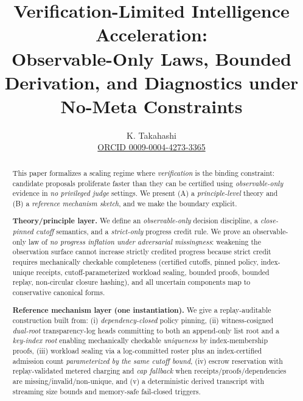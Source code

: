 \documentclass[11pt]{article}
\title{\textbf{Verification-Limited Intelligence Acceleration:}\\
Observable-Only Laws, Bounded Derivation, and Diagnostics under No-Meta Constraints}
\author{K. Takahashi\\\small\href{https://orcid.org/0009-0004-4273-3365}{ORCID 0009-0004-4273-3365}}
\date{\vspace{-0.8em}}
\newcommand{\term}[1]{\emph{#1}}
\newcommand{\1}{\mathbf{1}}
\theoremstyle{definition}
\theoremstyle{plain}
\begin{document}
\maketitle

\begin{abstract}
This paper formalizes a scaling regime where \term{verification} is the binding constraint: candidate proposals proliferate faster than they can be certified using \term{observable-only} evidence in \term{no privileged judge} settings. We present (A) a \emph{principle-level} theory and (B) a \emph{reference mechanism sketch}, and we make the boundary explicit.

\textbf{Theory/principle layer.} We define an \term{observable-only} decision discipline, a \term{close-pinned cutoff} semantics, and a \term{strict-only} progress credit rule. We prove an observable-only law of \term{no progress inflation under adversarial missingness}: weakening the observation surface cannot increase strictly credited progress because strict credit requires mechanically checkable completeness (certified cutoffs, pinned policy, index-unique receipts, cutoff-parameterized workload sealing, bounded proofs, bounded replay, non-circular closure hashing), and all uncertain components map to conservative canonical forms.

\textbf{Reference mechanism layer (one instantiation).} We give a replay-auditable construction built from: (i) \term{dependency-closed} policy pinning, (ii) witness-cosigned \term{dual-root} transparency-log heads committing to both an append-only list root and a \term{key-index root} enabling mechanically checkable \term{uniqueness} by index-membership proofs, (iii) workload sealing via a log-committed roster plus an index-certified admission count \emph{parameterized by the same cutoff bound}, (iv) escrow reservation with replay-validated metered charging and \term{cap fallback} when receipts/proofs/dependencies are missing/invalid/non-unique, and (v) a deterministic derived transcript with streaming size bounds and memory-safe fail-closed triggers.


\end{abstract}
\end{document}
